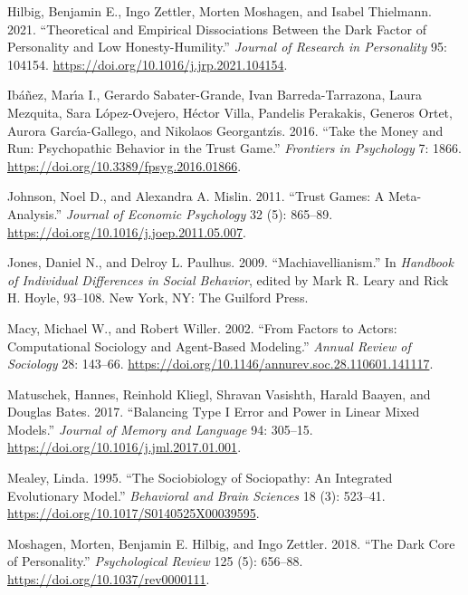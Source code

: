 \documentclass[
]{article}
\newlength{\cslhangindent}
\newenvironment{CSLReferences}[2] %
 {\begin{list}{}{%
  \setlength{\itemindent}{0pt}
  \setlength{\leftmargin}{0pt}
  \setlength{\parsep}{0pt}
  \ifodd #1
   \setlength{\leftmargin}{\cslhangindent}
   \setlength{\itemindent}{-1\cslhangindent}
  \fi
  \setlength{\itemsep}{#2\baselineskip}}}
 {\end{list}}
\begin{document}
\begin{CSLReferences}{1}{0}
Hilbig, Benjamin E., Ingo Zettler, Morten Moshagen, and Isabel Thielmann. 2021. {``Theoretical and Empirical Dissociations Between the Dark Factor of Personality and Low Honesty-Humility.''} \emph{Journal of Research in Personality} 95: 104154. \url{https://doi.org/10.1016/j.jrp.2021.104154}.

Ibáñez, Marı́a I., Gerardo Sabater-Grande, Ivan Barreda-Tarrazona, Laura Mezquita, Sara López-Ovejero, Héctor Villa, Pandelis Perakakis, Generos Ortet, Aurora Garcı́a-Gallego, and Nikolaos Georgantzı́s. 2016. {``Take the Money and Run: {Psychopathic} Behavior in the Trust Game.''} \emph{Frontiers in Psychology} 7: 1866. \url{https://doi.org/10.3389/fpsyg.2016.01866}.

Johnson, Noel D., and Alexandra A. Mislin. 2011. {``Trust Games: A Meta-Analysis.''} \emph{Journal of Economic Psychology} 32 (5): 865--89. \url{https://doi.org/10.1016/j.joep.2011.05.007}.

Jones, Daniel N., and Delroy L. Paulhus. 2009. {``{Machiavellianism}.''} In \emph{Handbook of Individual Differences in Social Behavior}, edited by Mark R. Leary and Rick H. Hoyle, 93--108. New York, NY: The Guilford Press.

Macy, Michael W., and Robert Willer. 2002. {``From Factors to Actors: Computational Sociology and Agent-Based Modeling.''} \emph{Annual Review of Sociology} 28: 143--66. \url{https://doi.org/10.1146/annurev.soc.28.110601.141117}.

Matuschek, Hannes, Reinhold Kliegl, Shravan Vasishth, Harald Baayen, and Douglas Bates. 2017. {``Balancing {Type I} Error and Power in Linear Mixed Models.''} \emph{Journal of Memory and Language} 94: 305--15. \url{https://doi.org/10.1016/j.jml.2017.01.001}.

Mealey, Linda. 1995. {``The Sociobiology of Sociopathy: {An} Integrated Evolutionary Model.''} \emph{Behavioral and Brain Sciences} 18 (3): 523--41. \url{https://doi.org/10.1017/S0140525X00039595}.

Moshagen, Morten, Benjamin E. Hilbig, and Ingo Zettler. 2018. {``The Dark Core of Personality.''} \emph{Psychological Review} 125 (5): 656--88. \url{https://doi.org/10.1037/rev0000111}.


\end{CSLReferences}
\end{document}
